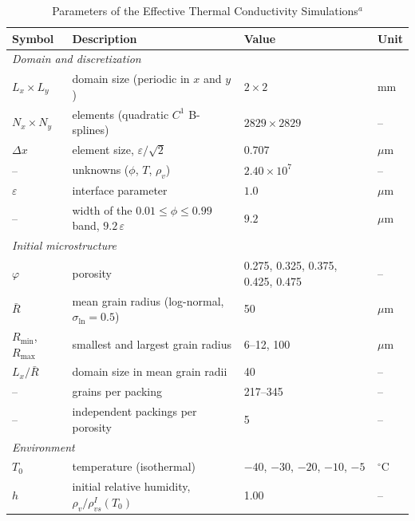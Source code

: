 \begin{table}
\caption{Parameters of the Effective Thermal Conductivity Simulations$^{a}$}
\centering
\begin{tabular}{l l l l}
\hline
 Symbol & Description & Value & Unit \\
\hline
 \multicolumn{4}{l}{\textit{Domain and discretization}} \\
 $L_x \times L_y$ & domain size (periodic in $x$ and $y$) & $2 \times 2$ & mm \\
 $N_x \times N_y$ & elements (quadratic $C^1$ B-splines) & $2829 \times 2829$ & -- \\
 $\Delta x$ & element size, $\varepsilon/\sqrt{2}$ & $0.707$ & $\mu$m \\
 -- & unknowns ($\phi$, $T$, $\rho_v$) & $2.40 \times 10^{7}$ & -- \\
 $\varepsilon$ & interface parameter & $1.0$ & $\mu$m \\
 -- & width of the $0.01 \le \phi \le 0.99$ band, $9.2\,\varepsilon$ & $9.2$ & $\mu$m \\
 \multicolumn{4}{l}{\textit{Initial microstructure}} \\
 $\varphi$ & porosity & 0.275, 0.325, 0.375, 0.425, 0.475 & -- \\
 $\bar{R}$ & mean grain radius (log-normal, $\sigma_{\ln} = 0.5$) & 50 & $\mu$m \\
 $R_{\min}$, $R_{\max}$ & smallest and largest grain radius & 6--12, 100 & $\mu$m \\
 $L_x/\bar{R}$ & domain size in mean grain radii & 40 & -- \\
 -- & grains per packing & 217--345 & -- \\
 -- & independent packings per porosity & 5 & -- \\
 \multicolumn{4}{l}{\textit{Environment}} \\
 $T_0$ & temperature (isothermal) & $-40$, $-30$, $-20$, $-10$, $-5$ & $^\circ$C \\
 $h$ & initial relative humidity, $\rho_v/\rho_{vs}^{I}(T_0)$ & 1.00 & -- \\

\end{tabular}
\end{table}
